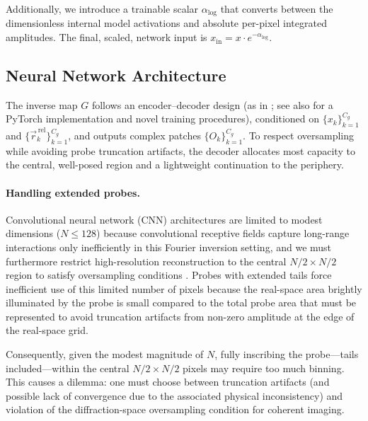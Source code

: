 \documentclass{optica-article}
\begin{document}
Additionally, we introduce a trainable scalar $\alpha_{\log}$ that converts between the dimensionless internal model activations and absolute per-pixel integrated amplitudes.  The final, scaled, network input is $x_{\text{in}} = x \cdot e^{-\alpha_{\log}}$.

\subsection{Neural Network Architecture}
\label{sec:nn}

The inverse map $G$ follows an encoder–decoder design (as in \cite{Hoidn2023PtychoPINN}; see also \cite{Vong2025GeneralizablePtycho} for a PyTorch implementation and novel training procedures), conditioned on $\{x_k\}_{k=1}^{C_g}$ and $\{\vec{r}^{\,\text{rel}}_k\}_{k=1}^{C_g}$, and outputs complex patches $\{O_k\}_{k=1}^{C_g}$. To respect oversampling while avoiding probe truncation artifacts, the decoder allocates most capacity to the central, well-posed region and a lightweight continuation to the periphery.

\paragraph{Handling extended probes.}
Convolutional neural network (CNN) architectures are limited to modest dimensions ($N \leq 128$) because convolutional receptive fields capture long-range interactions only inefficiently in this Fourier inversion setting, and we must furthermore restrict high-resolution reconstruction to the central $N/2 \times N/2$ region to satisfy oversampling conditions \cite{miao1999extending}. Probes with extended tails force inefficient use of this limited number of pixels because the real-space area brightly illuminated by the probe is small compared to the total probe area that must be represented to avoid truncation artifacts from non-zero amplitude at the edge of the real-space grid.

Consequently, given the modest magnitude of $N$, fully inscribing the probe—tails included—within the central $N/2 \times N/2$ pixels may require too much binning. This causes a dilemma: one must choose between truncation artifacts (and possible lack of convergence due to the associated physical inconsistency) and violation of the diffraction-space oversampling condition for coherent imaging.
\end{document}
